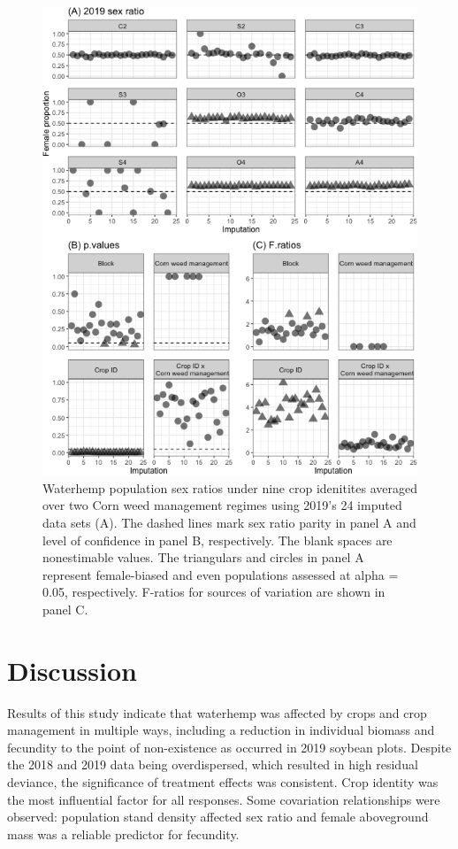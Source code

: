 \documentclass[
]{article}
\begin{document}
\begin{figure}[H]
\includegraphics[width=1\linewidth]{Manuscript_whole_files/figure-latex/sexr19-arrow-1} \caption{Waterhemp population sex ratios under nine crop idenitites averaged over two Corn weed management regimes using 2019's 24 imputed data sets (A). The dashed lines mark sex ratio parity in panel A and level of confidence in panel B, respectively. The blank spaces are nonestimable values. The triangulars and circles in panel A represent female-biased and even populations assessed at alpha = 0.05, respectively. F-ratios for sources of variation are shown in panel C.}\label{fig:sexr19-arrow}
\end{figure}

\hypertarget{discussion}{%
\section*{Discussion}\label{discussion}}

Results of this study indicate that waterhemp was affected by crops and crop management in multiple ways, including a reduction in individual biomass and fecundity to the point of non-existence as occurred in 2019 soybean plots.
Despite the 2018 and 2019 data being overdispersed, which resulted in high residual deviance, the significance of treatment effects was consistent. Crop identity was the most influential factor for all responses. Some covariation relationships were observed: population stand density affected sex ratio and female aboveground mass was a reliable predictor for fecundity.
\end{document}
